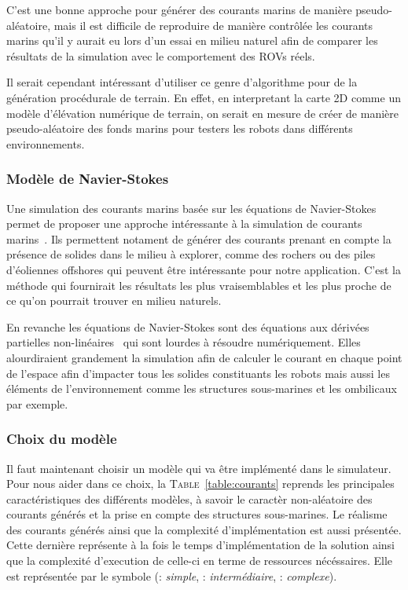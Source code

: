 				C'est une bonne approche pour générer des courants marins de manière pseudo-aléatoire, mais il est difficile de reproduire de manière contrôlée les courants marins qu'il y aurait eu lors d'un essai en milieu naturel afin de comparer les résultats de la simulation avec le comportement des \gls{ROV}s réels.
				
				Il serait cependant intéressant d'utiliser ce genre d'algorithme pour de la génération procédurale de terrain. En effet, en interpretant la carte 2D comme un modèle d'élévation numérique de terrain, on serait en mesure de créer de manière pseudo-aléatoire des fonds marins pour testers les robots dans différents environnements.

			\subsubsection{Modèle de Navier-Stokes}

				Une simulation des courants marins basée sur les équations de Navier-Stokes permet de proposer une approche intéressante à la simulation de courants marins~\cite{Garau2006current}. Ils permettent notament de générer des courants prenant en compte la présence de solides dans le milieu à explorer, comme des rochers ou des piles d'éoliennes offshores qui peuvent être intéressante pour notre application. C'est la méthode qui fournirait les résultats les plus vraisemblables et les plus proche de ce qu'on pourrait trouver en milieu naturels.

				En revanche les équations de Navier-Stokes sont des équations aux dérivées partielles non-linéaires~\cite{hinch2012hydrodynamique} qui sont lourdes à résoudre numériquement. Elles alourdiraient grandement la simulation afin de calculer le courant en chaque point de l'espace afin d'impacter tous les solides constituants les robots mais aussi les éléments de l'environnement comme les structures sous-marines et les ombilicaux par exemple.

			\subsubsection{Choix du modèle}

				Il faut maintenant choisir un modèle qui va être implémenté dans le simulateur. Pour nous aider dans ce choix, la \textsc{Table}~\ref{table:courants} reprends les principales caractéristiques des différents modèles, à savoir le caractèr non-aléatoire des courants générés et la prise en compte des structures sous-marines. Le réalisme des courants générés ainsi que la complexité d'implémentation est aussi présentée. Cette dernière représente à la fois le temps d'implémentation de la solution ainsi que la complexité d'execution de celle-ci en terme de ressources nécéssaires. Elle est représentée par le symbole \pmark (\pmark : \textit{simple}, \pmark \pmark : \textit{intermédiaire}, \pmark \pmark \pmark : \textit{complexe}).

